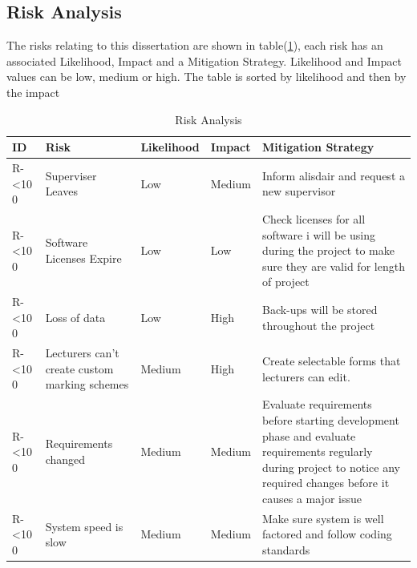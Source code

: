 \documentclass[12pt]{article}  %
\newcommand{\rid}[1]{\centering #1-\ifnum\value{requirement}<10 0\fi\arabic{requirement} \stepcounter{requirement}}
\begin{document}


\subsection{Risk Analysis}

The risks relating to this dissertation are shown in table(\ref{table:risks}), each risk has an associated Likelihood, Impact and a Mitigation Strategy. Likelihood and Impact values can be low, medium or high. The table is sorted by likelihood and then by the impact




\begin{spacing}{1.2}
\begin{longtable}[c]{|p{}|p{}|p{}|p{}|p{}|}
\caption{Risk Analysis} \label{table:risks} \\
\hline

\textbf{ID} & \textbf{Risk} & \textbf{Likelihood} & \textbf{Impact } & \textbf{Mitigation Strategy}\\
\hline

\rid{R} &Superviser Leaves & Low & Medium & Inform alisdair and request a new supervisor\\ \hline

\rid{R} &Software Licenses Expire & Low & Low & Check licenses for all software i will be using during the project to make sure they are valid for length of project\\ \hline 

\rid{R} &Loss of data & Low & High & Back-ups will be stored throughout the project\\ \hline

\rid{R} &Lecturers can’t create custom marking schemes & Medium & High & Create selectable forms that lecturers can edit.\\ \hline 

\rid{R} &Requirements changed & Medium & Medium & Evaluate requirements before starting development phase and evaluate requirements regularly during project to notice any required changes before it causes a major issue \\ \hline

\rid{R} & System speed is slow & Medium & Medium & Make sure system is well factored and follow coding standards \\ \hline


\end{longtable}
\end{spacing}
\end{document}
